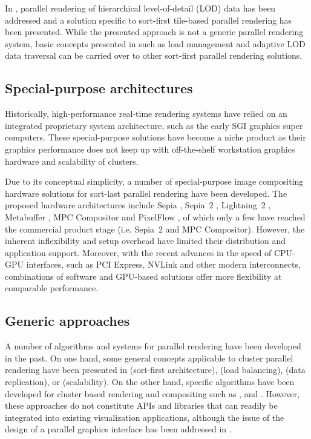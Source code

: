 In \cite{NC:07}, parallel rendering of hierarchical level-of-detail (LOD) data
has been addressed and a solution specific to sort-first tile-based parallel
rendering has been presented. While the presented approach is not a generic
parallel rendering system, basic concepts presented in \cite{NC:07} such as load
management and adaptive LOD data traversal can be carried over to other
sort-first parallel rendering solutions.

\subsection{Special-purpose architectures}

Historically, high-performance real-time rendering systems have relied on an
integrated proprietary system architecture, such as the early SGI graphics super
computers. These special-purpose solutions have become a niche product as their
graphics performance does not keep up with off-the-shelf workstation graphics
hardware and scalability of clusters.

Due to its conceptual simplicity, a number of special-purpose image compositing
hardware solutions for sort-last parallel rendering have been developed. The
proposed hardware architectures include Sepia \cite {MHS:99a,sepia}, Sepia~2
\cite{LMSBHa:01,LMSBH:01}, Lightning~2 \cite{Stoll01}, Metabuffer
\cite{Blanke00,Zhang01}, MPC Compositor \cite{Muraki01} and PixelFlow
\cite{Molnar92, Eyles97}, of which only a few have reached the commercial
product stage (i.e. Sepia~2 and MPC Compositor). However, the inherent
inflexibility and setup overhead have limited their distribution and application
support. Moreover, with the recent advances in the speed of CPU-GPU interfaces,
such as PCI Express, NVLink and other modern interconnects, combinations of
software and GPU-based solutions offer more flexibility at comparable
performance.

\subsection{Generic approaches}

A number of algorithms and systems for parallel rendering have been developed in
the past. On one hand, some general concepts applicable to cluster parallel
rendering have been presented in \cite{Mueller:95,Mueller:97} (sort-first
architecture), \cite{SZFLS:99,SFLS:00} (load balancing), \cite{SFL:01} (data
replication), or \cite{CMF:05,CM:06} (scalability). On the other hand, specific
algorithms have been developed for cluster based rendering and compositing such
as \cite{AP:98}, \cite{CKS:02} and \cite{YYC:01,SMLAP:03}. However, these
approaches do not constitute APIs and libraries that can readily be integrated
into existing visualization applications, although the issue of the design of a
parallel graphics interface has been addressed in \cite{Igehy98}.

